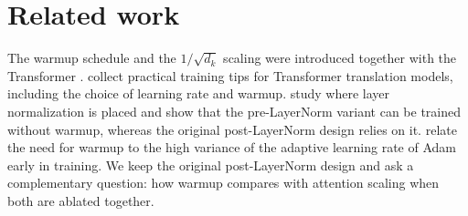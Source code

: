 \section{Related work}
\label{sec:related}

The warmup schedule and the $1/\sqrt{d_k}$ scaling were introduced together with the Transformer
\citep{vaswani2017attention}. \citet{popel2018training} collect practical training tips for Transformer translation
models, including the choice of learning rate and warmup. \citet{xiong2020layer} study where layer normalization is
placed and show that the pre-LayerNorm variant can be trained without warmup, whereas the original post-LayerNorm
design relies on it. \citet{liu2020variance} relate the need for warmup to the high variance of the adaptive learning
rate of Adam \citep{kingma2015adam} early in training. We keep the original post-LayerNorm design and ask a
complementary question: how warmup compares with attention scaling when both are ablated together.
